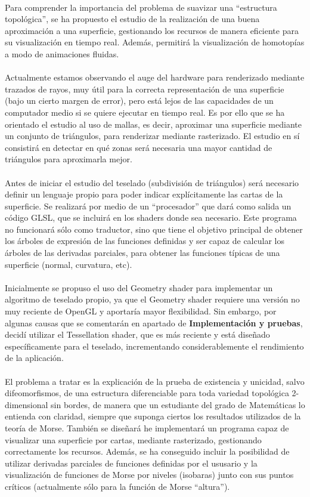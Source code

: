 \\Para comprender la importancia del problema de suavizar una ``estructura topológica'', se ha propuesto el estudio de la realización de una buena aproximación a una superficie, gestionando los recursos de manera eficiente para su visualización en tiempo real. Además, permitirá la visualización de homotopías a modo de animaciones fluidas.\\
\\Actualmente estamos observando el auge del hardware para renderizado mediante trazados de rayos, muy útil para la correcta representación de una superficie (bajo un cierto margen de error), pero está lejos de las capacidades de un computador medio si se quiere ejecutar en tiempo real. Es por ello que se ha orientado el estudio al uso de mallas, es decir, aproximar una superficie mediante un conjunto de triángulos, para renderizar mediante rasterizado. El estudio en sí consistirá en detectar en qué zonas será necesaria una mayor cantidad de triángulos para aproximarla mejor.\\
\\Antes de iniciar el estudio del teselado (subdivisión de triángulos) será necesario definir un lenguaje propio para poder indicar explícitamente las cartas de la superficie. Se realizará por medio de un ``procesador'' que dará como salida un código GLSL, que se incluirá en los shaders donde sea necesario. Este programa no funcionará sólo como traductor, sino que tiene el objetivo principal de obtener los árboles de expresión de las funciones definidas y ser capaz de calcular los árboles de las derivadas parciales, para obtener las funciones típicas de una superficie (normal, curvatura, etc).\\
\\Inicialmente se propuso el uso del Geometry shader para implementar un algoritmo de teselado propio, ya que el Geometry shader requiere una versión no muy reciente de OpenGL y aportaría mayor flexibilidad. Sin embargo, por algunas causas que se comentarán en apartado de \textbf{Implementación y pruebas}, decidí utilizar el Tessellation shader, que es más reciente y está diseñado específicamente para el teselado, incrementando considerablemente el rendimiento de la aplicación.\\
\\El problema a tratar es la explicación de la prueba de existencia y unicidad, salvo difeomorfismos, de una estructura diferenciable para toda variedad topológica 2-dimensional sin bordes, de manera que un estudiante del grado de Matemáticas lo entienda con claridad, siempre que suponga ciertos los resultados utilizados de la teoría de Morse. También se diseñará he implementará un programa capaz de visualizar una superficie por cartas, mediante rasterizado, gestionando correctamente los recursos. Además, se ha conseguido incluir la posibilidad de utilizar derivadas parciales de funciones definidas por el ususario y la visualización de funciones de Morse por niveles (isobaras) junto con sus puntos críticos (actualmente sólo para la función de Morse ``altura'').

